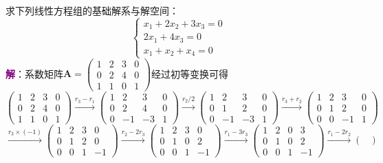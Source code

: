\begin{example}
	求下列线性方程组的基础解系与解空间：$$\left\{\begin{matrix} 
		x_1+2x_2+3x_3=0 \\  
		2x_1+4x_3=0 \\
		x_1+x_2+x_4=0
	\end{matrix}\right. $$
	\tcblower
	\textcolor{purple}{\textbf{解}}：系数矩阵$\mathbf{A}=\begin{pmatrix}
		1 & 2 & 3 & 0\\
		0 & 2 & 4 & 0\\
		1 & 1 & 0 & 1
	   \end{pmatrix}$经过初等变换可得$$\begin{pmatrix}
		1 & 2 & 3 & 0\\
		0 & 2 & 4 & 0\\
		1 & 1 & 0 & 1
	   \end{pmatrix}\xrightarrow{r_3-r_1}\begin{pmatrix}
		1 & 2 & 3 & 0\\
		0 & 2 & 4 & 0\\
		0 & -1 & -3 & 1
	   \end{pmatrix}\xrightarrow{r_2/2}\begin{pmatrix}
		1 & 2 & 3 & 0\\
		0 & 1 & 2 & 0\\
		0 & -1 & -3 & 1
	   \end{pmatrix}\xrightarrow{r_3+r_2}\begin{pmatrix}
		1 & 2 & 3 & 0\\
		0 & 1 & 2 & 0\\
		0 & 0 & -1 & 1
	   \end{pmatrix}$$$$\xrightarrow{r_3\times (-1)}\begin{pmatrix}
		1 & 2 & 3 & 0\\
		0 & 1 & 2 & 0\\
		0 & 0 & 1 & -1
	   \end{pmatrix}\xrightarrow{r_2-2r_3}\begin{pmatrix}
		1 & 2 & 3 & 0\\
		0 & 1 & 0 & 2\\
		0 & 0 & 1 & -1
	   \end{pmatrix}\xrightarrow{r_1-3r_3}\begin{pmatrix}
		1 & 2 & 0 & 3\\
		0 & 1 & 0 & 2\\
		0 & 0 & 1 & -1
	   \end{pmatrix}\xrightarrow{r_1-2r_2}\begin{pmatrix}

\end{pmatrix}$$
\end{example}
